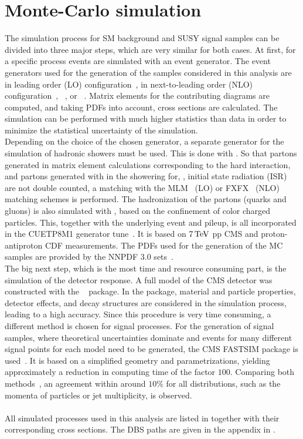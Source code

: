\section{Monte-Carlo simulation}\label{sec:Simulation}
The simulation process for SM background and SUSY signal samples can be divided into three major steps, which are very similar for both cases. At first, for a specific process events are simulated with an event generator. The event generators used for the generation of the samples considered in this analysis are  in leading order (LO) configuration~\cite{Madgraph1,Madgraph2,Madgraph3}, \MGvATNLO in next-to-leading order (NLO) configuration~\cite{Madgraph1,AMCATNLO}, ~\cite{Pythia}, or \POWHEG~\cite{Powheg1,Powheg2}. Matrix elements for the contributing diagrams are computed, and taking PDFs into account, cross sections are calculated. The simulation can be performed with much higher statistics than data in order to minimize the statistical uncertainty of the simulation.\\
Depending on the choice of the chosen generator, a separate generator for the simulation of hadronic showers must be used. This is done with . So that partons generated in matrix element calculations corresponding to the hard interaction, and partons generated with \PYTHIA in the showering for, \eg, initial state radiation (ISR) are not double counted, a matching with the \textsc{MLM}~\cite{Madgraph2} (LO) or \textsc{FXFX}~\cite{AMCATNLO} (NLO) matching schemes is performed. The hadronization of the partons (quarks and gluons) is also simulated with \PYTHIA, based on the confinement of color charged particles. This, together with the underlying event and pileup, is all incorporated in the \textsc{CUETP8M1} generator tune~\cite{Tune}. It is based on $7\,\text{Te\hspace{-.08em}V}$ pp CMS and proton-antiproton CDF measurements. The PDFs used for the generation of the MC samples are provided by the \textsc{NNPDF} 3.0 sets~\cite{NNPDF}.\\
The big next step, which is the most time and resource consuming part, is the simulation of the detector response. A full model of the CMS detector was constructed with the \GEANTfour~\cite{Geant} package. In the \GEANTfour package, material and particle properties, detector effects, and decay structures are considered in the simulation process, leading to a high accuracy. Since this procedure is very time consuming, a different method is chosen for signal processes. For the generation of signal samples, where theoretical uncertainties dominate and events for many different signal points for each model need to be generated, the CMS \textsc{FASTSIM} package is used~\cite{FastSim}. It is based on a simplified geometry and parametrizations, yielding approximately a reduction in computing time of the factor $100$. Comparing both methods~\cite{FastSimQuality}, an agreement within around $10\%$ for all distributions, such as the momenta of particles or jet multiplicity, is observed.\\
\\
All simulated processes used in this analysis are listed in  together with their corresponding cross sections. The DBS paths are given in the appendix in .\\



